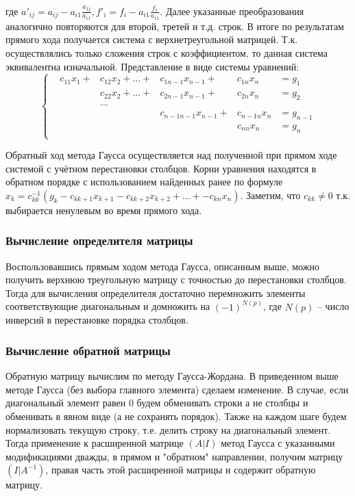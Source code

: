 \documentclass[a4paper,12pt,titlepage,finall]{article}
\begin{document}
\\
где $a'_{ij} = a_{ij} - a_{i1} \frac{a_{1j}}{a_{11}}, f'_i = f_i - a_{i1} \frac{f_1}{a_{11}}$. Далее указанные преобразования аналогично повторяются для второй, третей и т.д. строк. В итоге по результатам прямого хода получается система с верхнетреугольной матрицей. Т.к. осуществлялись только сложения строк с коэффициентом, то данная система эквивалентна изначальной. Представление в виде системы уравнений:
\begin{equation*}
\left\{
\begin{alignedat}{3}
&c_{11} x_1 + & c_{12} x_2 + ... +&c_{1 n-1} x_{n-1} +     &c_{1n} x_n    & = g_1\\
  &           & c_{22} x_2 + ... +&c_{2 n-1} x_{n-1} +     &c_{2n} x_n    & = g_2\\
&&...&&&\\
&             &                   &c_{n - 1 n-1} x_{n-1} + &c_{n-1 n} x_n & = g_{n-1}\\
 &            &                   &                        &c_{nn} x_n    & = g_n\\
\end{alignedat}
\right.
\end{equation*}
\par
Обратный ход метода Гаусса осуществляется над полученной при прямом ходе системой с учётном перестановки столбцов. Корни уравнения находятся в обратном порядке с использованием найденных ранее по формуле $x_k = c^{-1}_{kk} (g_k - c_{k k+1}x_{k+1} - c_{k k+2}x_{k+2} + ... + - c_{k n}x_n)$. Заметим, что $c_{kk} \neq 0$ т.к. выбирается ненулевым во время прямого хода.

\subsubsection{Вычисление определителя матрицы}
Воспользовавшись прямым ходом метода Гаусса, описанным выше, можно получить верхнюю треугольную матрицу с точностью до перестановки столбцов. Тогда для вычисления определителя достаточно перемножить элементы соответствующие диагональным и домножить на $(-1)^{N(p)}$, где $N(p)$ -- число инверсий в перестановке порядка столбцов.
\subsubsection{Вычисление обратной матрицы}
Обратную матрицу вычислим по методу Гаусса-Жордана. В приведенном выше методе Гаусса (без выбора главного элемента) сделаем изменение. В случае, если диагональный элемент равен $0$ будем обменивать строки а не столбцы и обменивать в явном виде (а не сохранять порядок). Также на каждом шаге будем нормализовать текущую строку, т.е. делить строку на диагональный элемент. Тогда применение к расширенной матрице $(A|I)$ метод Гаусса с указанными модификациями дважды,  в прямом и "обратном" направлении, получим матрицу $(I|A^{-1})$, правая часть этой расширенной матрицы и содержит обратную матрицу.
\end{document}
